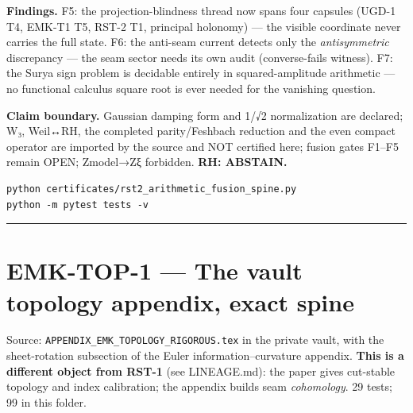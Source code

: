 \textbf{Findings.} F5: the projection-blindness thread now spans four capsules
(UGD-1 T4, EMK-T1 T5, RST-2 T1, principal holonomy) --- the visible
coordinate never carries the full state. F6: the anti-seam current
detects only the \emph{antisymmetric} discrepancy --- the seam sector needs its
own audit (converse-fails witness). F7: the Surya sign problem is
decidable entirely in squared-amplitude arithmetic --- no functional
calculus square root is ever needed for the vanishing question.

\textbf{Claim boundary.} Gaussian damping form and 1/√2 normalization are
declared; W₃, Weil↔RH, the completed parity/Feshbach reduction and the
even compact operator are imported by the source and NOT certified here;
fusion gates F1--F5 remain OPEN; Zmodel→Zξ forbidden. \textbf{RH: ABSTAIN.}

\begin{verbatim}
python certificates/rst2_arithmetic_fusion_spine.py
python -m pytest tests -v
\end{verbatim}

\begin{center}\rule{0.5\linewidth}{0.5pt}\end{center}

\hypertarget{emk-top-1-the-vault-topology-appendix-exact-spine}{%
\chapter{EMK-TOP-1 --- The vault topology appendix, exact spine}\label{emk-top-1-the-vault-topology-appendix-exact-spine}}

Source: \texttt{APPENDIX\_EMK\_TOPOLOGY\_RIGOROUS.tex} in the private vault, with
the sheet-rotation subsection of the Euler information--curvature
appendix. \textbf{This is a different object from RST-1} (see LINEAGE.md):
the paper gives cut-stable topology and index calibration; the appendix
builds seam \emph{cohomology}. 29 tests; 99 in this folder.

